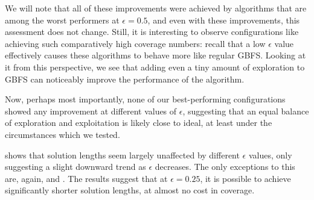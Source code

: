 We will note that all of these improvements were achieved by algorithms that are among the worst performers at $\epsilon=0.5$, and even with these improvements, this assessment does not change. Still, it is interesting to observe configurations like \hiUu achieving such comparatively high coverage numbers: recall that a low $\epsilon$ value effectively causes these algorithms to behave more like regular GBFS. Looking at it from this perspective, we see that adding even a tiny amount of exploration to GBFS can noticeably improve the performance of the algorithm.

Now, perhaps most importantly, none of our best-performing configurations showed any improvement at different values of $\epsilon$, suggesting that an equal balance of exploration and exploitation is likely close to ideal, at least under the circumstances which we tested.

 shows that solution lengths seem largely unaffected by different $\epsilon$ values, only suggesting a slight downward trend as $\epsilon$ decreases. The only exceptions to this are, again, \hiDu and \hiDh. The results suggest that at $\epsilon=0.25$, it is possible to achieve significantly shorter solution lengths, at almost no cost in coverage.

